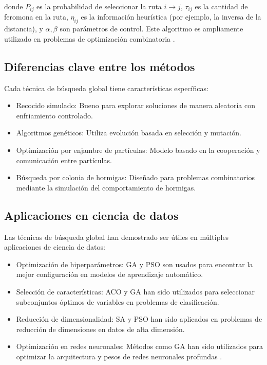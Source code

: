 \begin{itemize}
		donde \(P_{ij}\) es la probabilidad de seleccionar la ruta \(i \to j\), \(\tau_{ij}\) es la cantidad de feromona en la ruta, \(\eta_{ij}\) es la información heurística (por ejemplo, la inversa de la distancia), y \(\alpha, \beta\) son parámetros de control. Este algoritmo es ampliamente utilizado en problemas de optimización combinatoria \cite{dorigo1997ant}.
		
		\subsection{Diferencias clave entre los métodos}
		
		Cada técnica de búsqueda global tiene características específicas:
		
		\begin{itemize}
			\item Recocido simulado: Bueno para explorar soluciones de manera aleatoria con enfriamiento controlado.
			\item Algoritmos genéticos: Utiliza evolución basada en selección y mutación.
			\item Optimización por enjambre de partículas: Modelo basado en la cooperación y comunicación entre partículas.
			\item Búsqueda por colonia de hormigas: Diseñado para problemas combinatorios mediante la simulación del comportamiento de hormigas.
		\end{itemize}
		
		\subsection{Aplicaciones en ciencia de datos}
		
		Las técnicas de búsqueda global han demostrado ser útiles en múltiples aplicaciones de ciencia de datos:
		
		\begin{itemize}
			\item Optimización de hiperparámetros: GA y PSO son usados para encontrar la mejor configuración en modelos de aprendizaje automático.
			\item Selección de características: ACO y GA han sido utilizados para seleccionar subconjuntos óptimos de variables en problemas de clasificación.
			\item Reducción de dimensionalidad: SA y PSO han sido aplicados en problemas de reducción de dimensiones en datos de alta dimensión.
			\item Optimización en redes neuronales: Métodos como GA han sido utilizados para optimizar la arquitectura y pesos de redes neuronales profundas \cite{goodfellow2016deep}.
		\end{itemize}
		

\end{itemize}
